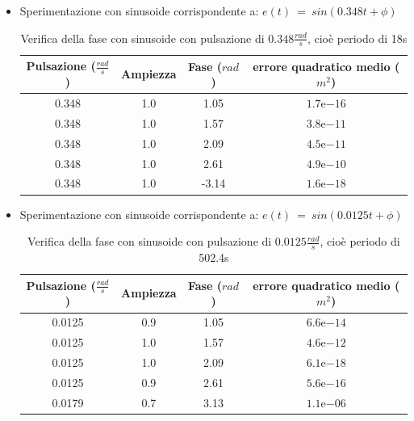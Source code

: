 \documentclass[a4paper,12pt]{report}
\newcommand{\expnumber}[2]{{#1}\mathrm{e}{#2}}
\begin{document}
\begin{itemize}
  \item Sperimentazione con sinusoide corrispondente a:
    $e(t)~=~sin(0.348t +\phi)$


  \begin{table}[H]
    \caption{Verifica della fase con sinusoide con pulsazione di $0.348\frac{rad}{s}$, cioè periodo di 18s }
    \label{tab:prestazioni_fase1}
    \center
      \begin{tabular}{SSSS}
        \toprule
        {Pulsazione ($\frac{rad}{s}$)} & {Ampiezza} & {Fase ($rad$)} & {errore quadratico medio ($m^2$)} \\
         & 1.0 & 1.05 & $\expnumber{1.7}{-16}$ \\
         0.348 & 1.0 & 1.57 & $\expnumber{3.8}{-11}$ \\
         0.348 & 1.0 & 2.09 & $\expnumber{4.5}{-11}$ \\
         0.348 & 1.0 & 2.61 & $\expnumber{4.9}{-10}$ \\
         0.348 & 1.0 & -3.14 & $\expnumber{1.6}{-18}$ \\
        \bottomrule
      \end{tabular}
  \end{table}

  \item Sperimentazione con sinusoide corrispondente a:
    $e(t)~=~sin(0.0125t +\phi)$
  \begin{table}[H]
    \caption{Verifica della fase con sinusoide con pulsazione di $0.0125\frac{rad}{s}$, cioè periodo di 502.4s }
    \label{tab:prestazioni_fase2}
    \center
      \begin{tabular}{SSSS}
        \toprule
        {Pulsazione ($\frac{rad}{s}$)} & {Ampiezza} & {Fase ($rad$)} & {errore quadratico medio ($m^2$)} \\
         & 0.9 & 1.05 & $\expnumber{6.6}{-14}$ \\
         0.0125 & 1.0 & 1.57 & $\expnumber{4.6}{-12}$ \\
         0.0125 & 1.0 & 2.09 & $\expnumber{6.1}{-18}$ \\
         0.0125 & 0.9 & 2.61 & $\expnumber{5.6}{-16}$ \\
         0.0179 & 0.7 & 3.13 & $\expnumber{1.1}{-06}$ \\
        \bottomrule
      \end{tabular}
  \end{table}
\end{itemize}
\end{document}
